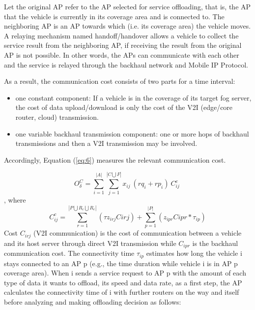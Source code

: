 \documentclass[twocolumn]{article}
\begin{document}
\par Let the original AP refer to the AP selected for service offloading, that is, the AP that the vehicle is currently in its coverage area and is connected to. The neighboring AP is an AP towards which (i.e. its coverage area) the vehicle moves. A relaying mechanism named handoff/handover allows a vehicle to collect the service result from the neighboring AP, if receiving the result from the original AP is not possible. In other words, the APs can communicate with each other and the service is relayed through the backhaul network and Mobile IP Protocol\cite{zhang2017mobile,li2019compound,janevski2003traffic}.
\par As a result, the communication cost consists of two parts for a time interval: 
\begin{itemize}
\item one constant component: If a vehicle is in the coverage of its target fog server, the cost of data upload/download is only the cost of the V2I (edge/core router, cloud) transmission.
\item one variable backhaul transmission component: one or more hops of backhaul transmissions and then a V2I transmission may be involved\cite{li2019compound}. 
\end{itemize}
Accordingly, Equation (\ref{eq:6}) measures the relevant communication cost.

\begin{equation}
O_{\delta}^{C} = \sum_{i=1}^{|A|} \sum_{j=1}^{|{C}\bigcup{F}|}x_{ij} \ (rq_{i}+rp_{i}) \ C_{ij}^{c} \
\label{eq:6}
\end{equation}
, where
\begin{equation}
C_{ij}^{c} = \sum_{r=1}^{|{P}\bigcup{R_{c}}\bigcup{R_{e}}|} ({\tau} z_{irj} Cirj) + \sum_{p=1}^{|P|} (z_{ipr} Cipr * {\tau}_{ip})
\label{eq:6.1}
\end{equation}
Cost $C_{irj}$ (V2I communication) is the cost of communication between a vehicle and its host server through direct V2I transmission while $C_{ipr}$ is the backhaul communication cost. The connectivity time $ {\tau}_{ip}$ estimates how long the vehicle i stays connected to an AP p (e.g., the time duration while vehicle i is in AP p coverage area). When i sends a service request to AP p with the amount of each type of data it wants to offload, its speed and data rate, as a first step, the AP calculates the connectivity time of i with further routers on the way and itself before analyzing and making offloading decision as follows:
\end{document}
